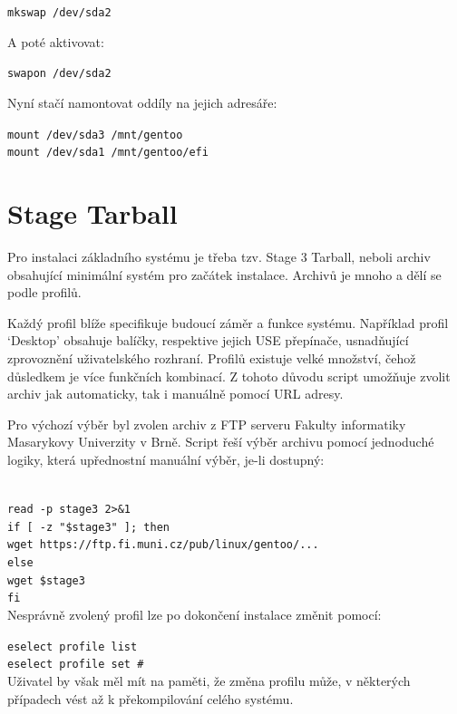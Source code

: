 \documentclass[12pt,a4paper,twoside,]{article}
\begin{document}
{\texttt{mkswap /dev/sda2}

A poté aktivovat:

\texttt{swapon /dev/sda2}

Nyní stačí namontovat oddíly na jejich adresáře:

\texttt{mount /dev/sda3 /mnt/gentoo}\\
\texttt{\hspace*{1.5em}mount /dev/sda1 /mnt/gentoo/efi}

\newpage
\section{\textsf{Stage Tarball}}
{Pro instalaci základního systému je třeba tzv. Stage 3 Tarball, neboli archiv obsahující
minimální systém pro začátek instalace. Archivů je mnoho a dělí se podle profilů.

Každý profil blíže specifikuje budoucí záměr a funkce systému. Například profil
‘Desktop’ obsahuje balíčky, respektive jejich USE přepínače, usnadňující zprovoznění
uživatelského rozhraní.
Profilů existuje velké množství, čehož důsledkem je více funkčních kombinací. Z
tohoto důvodu script umožňuje zvolit archiv jak automaticky, tak i manuálně pomocí
URL adresy. 

Pro výchozí výběr byl zvolen archiv z FTP serveru Fakulty informatiky
Masarykovy Univerzity v Brně. Script řeší výběr archivu pomocí jednoduché logiky,
která upřednostní manuální výběr, je-li dostupný:}\\

\texttt{read -p stage3 2>\&1}\\
\texttt{if [ -z "\$stage3" ]; then}\\
\texttt{\hspace*{+1.5em}wget https://ftp.fi.muni.cz/pub/linux/gentoo/...\\}
\texttt{else}\\
\texttt{\hspace*{+1.5em}wget \$stage3}\\
\texttt{fi}\\

{Nesprávně zvolený profil lze po dokončení instalace změnit pomocí:\\}

\texttt{eselect profile list}\\
\texttt{\hspace*{--1.5em}eselect profile set \#}\\

{Uživatel by však měl mít na paměti, že změna profilu může, v některých případech
vést až k překompilování celého systému.}

}
\end{document}
